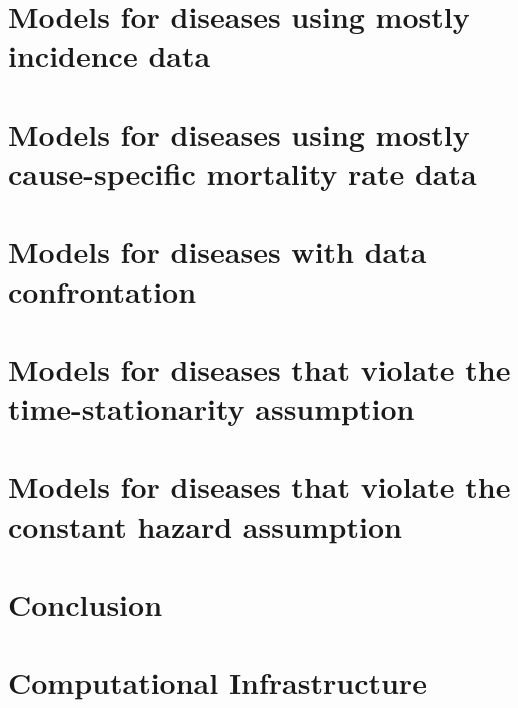 \chapter[Mostly Incidence]{Models for diseases using mostly incidence data}
\label{chapter:practice-mostly_incidence}

\chapter[CSMR Driven]{Models for diseases using mostly cause-specific mortality rate data}
\label{chapter:practice-csmr_data}

\chapter[Data Confrontation]{Models for diseases with data confrontation}
\label{chapter:practice-data_confrontation}

\chapter[Time Varying]{Models for diseases that violate the time-stationarity assumption}
\label{chapter:practice-time_varying}

\chapter[Non-constant hazards]{Models for diseases that violate the constant hazard assumption}
\label{chapter:practice-two_stage}




\chapter{Conclusion}



\chapter{Computational Infrastructure}



